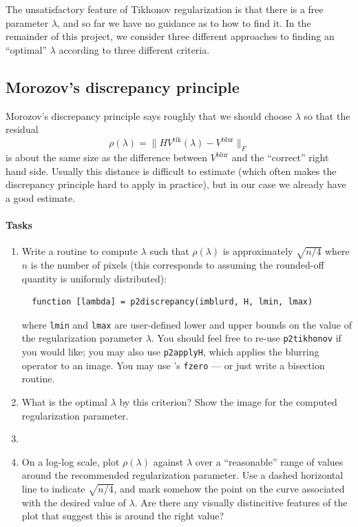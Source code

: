\documentclass[12pt, leqno]{article} %
\begin{document}
The unsatisfactory feature of Tikhonov regularization is that there
is a free parameter $\lambda$, and so far we have no guidance as to
how to find it.  In the remainder of this project, we consider three
different approaches to finding an ``optimal'' $\lambda$ according
to three different criteria.

\subsection{Morozov's discrepancy principle}

Morozov's discrepancy
principle says roughly that we should choose $\lambda$ so that the
residual
\[
  \rho(\lambda) = \|HV^{\mathrm{tik}}(\lambda) - V^{\mathrm{blur}}\|_F
\]
is about the same size as the difference between $V^{\mathrm{blur}}$
and the ``correct'' right hand side.  Usually this distance is difficult
to estimate (which often makes the discrepancy principle hard to apply
in practice), but in our case we already have a good estimate.

\paragraph*{Tasks}
\begin{enumerate}
\item
  Write a routine to compute $\lambda$ such
  that $\rho(\lambda)$ is approximately $\sqrt{n/4}$ where $n$
  is the number of pixels (this corresponds to assuming the
  rounded-off quantity is uniformly distributed):
\begin{lstlisting}
  function [lambda] = p2discrepancy(imblurd, H, lmin, lmax)
\end{lstlisting}
  where {\tt lmin} and {\tt lmax} are user-defined lower and upper
  bounds on the value of the regularization parameter $\lambda$.
  You should feel free to re-use {\tt p2tikhonov} if you would like;
  you may also use {\tt p2applyH}, which applies the blurring operator
  to an image.  You may use \matlab's {\tt fzero} --- or just write a
  bisection routine.
\item
  What is the optimal $\lambda$ by this criterion?
  Show the image for the computed regularization parameter.
\item
\item
  On a log-log scale, plot $\rho(\lambda)$ against $\lambda$ over
  a ``reasonable'' range of values around the recommended
  regularization parameter.  Use a dashed horizontal line to indicate
  $\sqrt{n/4}$, and mark somehow the point on the
  curve associated with the desired value of $\lambda$.  Are there any
  visually distincitive features of the plot that suggest this is
  around the right value?
\end{enumerate}
\end{document}
